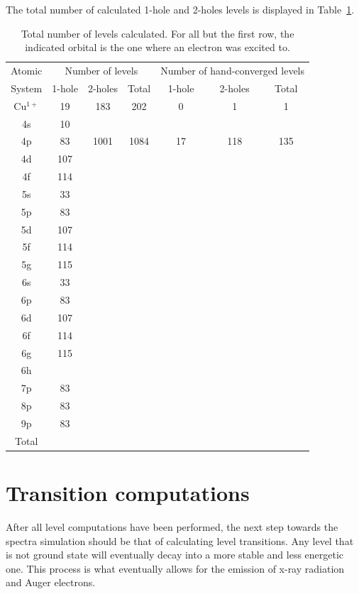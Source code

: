 The total number of calculated 1-hole and 2-holes levels is displayed in Table~\ref{tab:tot_levels}.

\begin{table}[h!]
    \centering
    \caption{Total number of levels calculated. For all but the first row, the indicated orbital is the one where an electron was excited to.}
    \label{tab:tot_levels}
    \begin{tabular}{c||c|c|c||c|c|c}
        \toprule Atomic&\multicolumn{3}{c||}{Number of levels}&\multicolumn{3}{c}{Number of hand-converged levels}\\
        System&1-hole&2-holes&Total&1-hole&2-holes&Total\\
        \midrule
        Cu$^{1+}$ & 19 &183&202&0&1&1\\ 
        4s& 10\\
        4p & 83 &1001 &1084&17&118&135\\
        4d & 107 &\\
        4f & 114\\
        5s & 33\\
        5p & 83\\
        5d & 107\\
        5f & 114\\
        5g & 115\\
        6s & 33\\
        6p & 83\\
        6d & 107\\
        6f & 114\\
        6g & 115\\
        6h\\
        7p & 83\\
        8p & 83\\
        9p & 83\\
        \midrule
        Total\\
        \bottomrule
    \end{tabular}
\end{table}




\section{Transition computations}

After all level computations have been performed, the next step towards the spectra simulation should be that of calculating level transitions. Any level that is not ground state will eventually decay into a more stable and less energetic one. This process is what eventually allows for the emission of x-ray radiation and Auger electrons.

